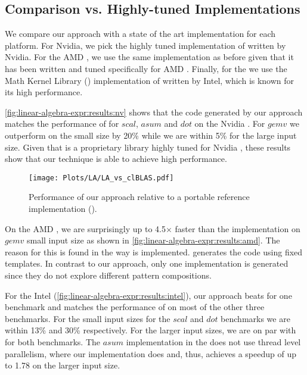 \subsection{Comparison vs. Highly-tuned Implementations}

We compare our approach with a state of the art implementation for each platform.
For Nvidia, we pick the highly tuned \CUBLAS implementation of \BLAS written by Nvidia.
For the AMD \GPU, we use the same \clBLAS implementation as before given that it has been written and tuned specifically for AMD \GPUs.
Finally, for the \CPU we use the Math Kernel Library (\MKL) implementation of \BLAS written by Intel, which is known for its high performance.

\autoref{fig:linear-algebra-expr:results:nv} shows that the code generated by our approach matches the performance of \CUBLAS for $scal$, $asum$ and $dot$ on the Nvidia \GPU.
For $gemv$ we outperform \CUBLAS on the small size by 20\% while we are within 5\% for the large input size.
Given that \CUBLAS is a proprietary library highly tuned for Nvidia \GPUs, these results show that our technique is able to achieve high performance.

\begin{figure}[t]
  \centering
  \texttt{[image: Plots/LA/LA\_vs\_clBLAS.pdf]}
  \caption[Performance of our approach relative to a portable \OpenCL reference implementation]%
          {Performance of our approach relative to a portable \OpenCL reference implementation (\clBLAS).}
  \label{fig:linear-algebra-expr:clblas}
\end{figure}

On the AMD \GPU, we are surprisingly up to 4.5$\times$ faster than the \clBLAS implementation on $gemv$ small input size as shown in \autoref{fig:linear-algebra-expr:results:amd}.
The reason for this is found in the way \clBLAS is implemented.
\clBLAS generates the \OpenCL code using fixed templates.
In contrast to our approach, only one implementation is generated since they do not explore different pattern compositions.

For the Intel \CPU (\autoref{fig:linear-algebra-expr:results:intel}), our approach beats \MKL for one benchmark and matches the performance of \MKL on most of the other three benchmarks.
For the small input sizes for the $scal$ and $dot$ benchmarks we are within 13\% and 30\% respectively.
For the larger input sizes, we are on par with \MKL for both benchmarks.
The $asum$ implementation in the \MKL does not use thread level parallelism, where our implementation does and, thus, achieves a speedup of up to 1.78 on the larger input size.


